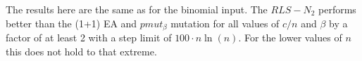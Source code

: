 The results here are the same as for the binomial input. The $RLS-N_2$ performs better than the (1+1) EA and $pmut_\beta$ mutation for all values of $c/n$ and $\beta$ by a factor of at least 2 with a step limit of $100 \cdot n \ln(n)$. For the lower values of $n$ this does not hold to that extreme.






